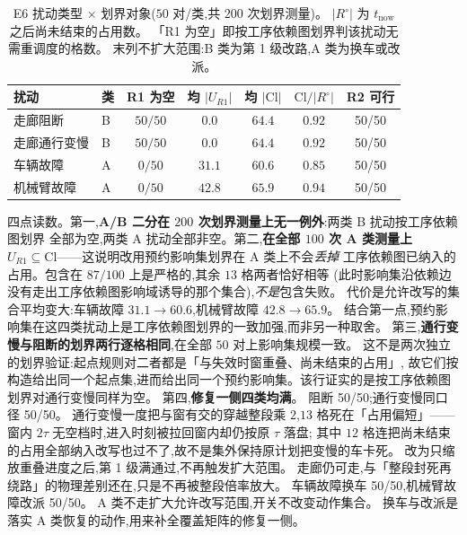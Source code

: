 \documentclass[manuscript,screen,review]{acmart}
\newcommand{\NPairs}{50}
\newcommand{\StrictlyLarger}{87/100}
\newcommand{\FeasESixBlock}{\NPairs/\NPairs}
\newcommand{\FeasSlow}{\NPairs/\NPairs}
\newcommand{\FeasESixAgv}{\NPairs/\NPairs}
\newcommand{\FeasESixRa}{\NPairs/\NPairs}
\begin{document}
\begin{table}[t]
\centering
\caption{E6 扰动类型 \(\times\) 划界对象(\(\NPairs\) 对/类,共 \(200\) 次划界测量)。
\(|R^{\circ}|\) 为 \(t_{\mathrm{now}}\) 之后尚未结束的占用数。
「R1 为空」即按工序依赖图划界判该扰动无需重调度的格数。
末列不扩大范围:B 类为第 1 级改路,A 类为换车或改派。}
\label{tab:e6}
\small
\begin{tabular}{@{}llccccc@{}}
\toprule
扰动 & 类 & R1 为空 & 均 \(|U_{R1}|\) & 均 \(|\mathrm{Cl}|\)
 & \(\mathrm{Cl}/|R^{\circ}|\) & R2 可行 \\
\midrule
走廊阻断   & B & \(50/50\) & \(0.0\)  & \(64.4\) & \(0.92\) & \FeasESixBlock \\
走廊通行变慢 & B & \(50/50\) & \(0.0\)  & \(64.4\) & \(0.92\) & \FeasSlow \\
车辆故障   & A & \(0/50\)  & \(31.1\) & \(60.6\) & \(0.85\) & \FeasESixAgv \\
机械臂故障 & A & \(0/50\)  & \(42.8\) & \(65.9\) & \(0.94\) & \FeasESixRa \\
\bottomrule
\end{tabular}
\end{table}

四点读数。第一,\textbf{A/B 二分在 \(200\) 次划界测量上无一例外}:两类 B 扰动按工序依赖图划界
全部为空,两类 A 扰动全部非空。第二,\textbf{在全部 \(100\) 次 A 类测量上
\(U_{R1}\subseteq\mathrm{Cl}\)}——这说明改用预约影响集划界在 A 类上不会\emph{丢掉}
工序依赖图已纳入的占用。包含在 \(\StrictlyLarger\) 上是严格的,其余 \(13\) 格两者恰好相等
(此时影响集沿依赖边没有走出工序依赖图影响域诱导的那个集合),\emph{不是}包含失败。
代价是允许改写的集合平均变大:车辆故障 \(31.1\to 60.6\),机械臂故障 \(42.8\to 65.9\)。
结合第一点,预约影响集在这四类扰动上是工序依赖图划界的一致加强,而非另一种取舍。
第三,\textbf{通行变慢与阻断的划界两行逐格相同},在全部 \(50\) 对上影响集规模一致。
这不是两次独立的划界验证:起点规则对二者都是「与失效时窗重叠、尚未结束的占用」,
故它们按构造给出同一个起点集,进而给出同一个预约影响集。该行证实的是按工序依赖图划界对通行变慢同样为空。
第四,\textbf{修复一侧四类均满}。
阻断 \FeasESixBlock;通行变慢同口径 \FeasSlow。
通行变慢一度把与窗有交的穿越整段乘 \(2\),\(13\) 格死在「占用偏短」——
窗内 \(2\tau\) 无空档时,进入时刻被拉回窗内却仍按原 \(\tau\) 落盘;
其中 \(12\) 格连把尚未结束的占用全部纳入改写也过不了,故不是集外保持原计划把变慢的车卡死。
改为只缩放重叠进度之后,第 1 级满通过,不再触发扩大范围。
走廊仍可走,与「整段封死再绕路」的物理差别还在,只是不再被整段倍率放大。
车辆故障换车 \FeasESixAgv,机械臂故障改派 \FeasESixRa。
A 类不走扩大允许改写范围,开关不改变动作集合。
换车与改派是落实 A 类恢复的动作,用来补全覆盖矩阵的修复一侧。
\end{document}
